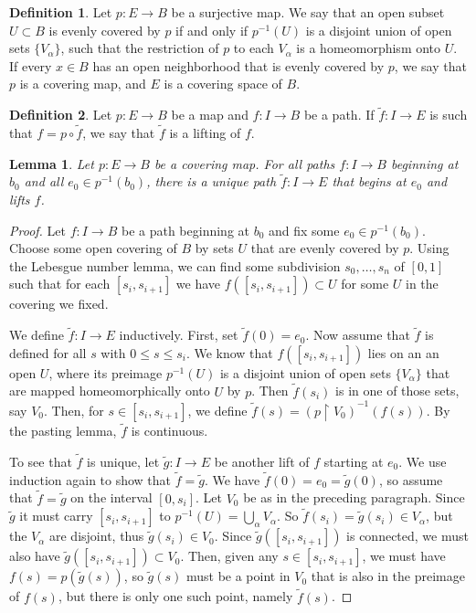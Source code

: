 \documentclass{report}
\newtheorem{lemma}{Lemma}[section]
\theoremstyle{definition}
\newtheorem{definition}{Definition}[section]
\theoremstyle{remark}
\newcommand{\set}[1]{\{#1\}}
\begin{document}
\begin{definition}
    Let $p : E \to B$ be a surjective map. We say that an open subset $U \subset B$ is evenly covered by $p$ if and only if $p^{-1}(U)$ is a disjoint union of open sets $\set{V_\alpha}$, such that the restriction of $p$ to each $V_\alpha$ is a homeomorphism onto $U$. If every $x \in B$ has an open neighborhood that is evenly covered by $p$, we say that $p$ is a covering map, and $E$ is a covering space of $B$.
\end{definition}

\begin{definition}
    Let $p : E \to B$ be a map and $f : I \to B$ be a path. If $\tilde{f} : I \to  E$ is such that $f = p \circ \tilde{f}$, we say that $\tilde{f}$ is a lifting of $f$.
\end{definition}

\begin{lemma} \label{lem_lift_path}
    Let $p : E \to B$ be a covering map. For all paths $f : I \to B$ beginning at $b_0$ and all $e_0 \in p^{-1}(b_0)$, there is a unique path $\tilde{f} : I \to E$ that begins at $e_0$ and lifts $f$.
\end{lemma}

\begin{proof}
    Let $f : I \to B$ be a path beginning at $b_0$ and fix some $e_0 \in p^{-1}(b_0)$. Choose some open covering of $B$ by sets $U$ that are evenly covered by $p$. Using the Lebesgue number lemma, we can find some subdivision $s_0, \dots, s_n$ of $[0, 1]$ such that for each $[s_i, s_{i+1}]$ we have $f([s_i, s_{i+1}]) \subset U$ for some $U$ in the covering we fixed.
    
    We define $\tilde{f} : I \to E$ inductively. First, set $\tilde{f}(0) = e_0$. Now assume that $\tilde{f}$ is defined for all $s$ with $0 \leq s \leq s_i$. We know that $f([s_i, s_{i+1}])$ lies on an an open $U$, where its preimage $p^{-1}(U)$ is a disjoint union of open sets $\set{V_\alpha}$ that are mapped homeomorphically onto $U$ by $p$. Then $\tilde{f}(s_i)$ is in one of those sets, say $V_0$. Then, for $s \in [s_i, s_{i+1}]$, we define $\tilde{f}(s) = (p\restriction{V_0})^{-1}(f(s))$. By the pasting lemma, $\tilde{f}$ is continuous.
    
    To see that $\tilde{f}$ is unique, let $\tilde{g} : I \to E$ be another lift of $f$ starting at $e_0$. We use induction again to show that $\tilde{f} = \tilde{g}$. We have $\tilde{f}(0) = e_0 = \tilde{g}(0)$, so assume that $\tilde{f} = \tilde{g}$ on the interval $[0, s_i]$. Let $V_0$ be as in the preceding paragraph. Since $\tilde{g}$ it must carry $[s_i, s_{i+1}]$ to $p^{-1}(U) = \bigcup_\alpha V_\alpha$. So $\tilde{f}(s_i) = \tilde{g}(s_i) \in V_\alpha$, but the $V_\alpha$ are disjoint, thus $\tilde{g}(s_i) \in V_0$. Since $\tilde{g}([s_i, s_{i+1}])$ is connected, we must also have $\tilde{g}([s_i, s_{i+1}]) \subset V_0$. Then, given any $s \in [s_i, s_{i+1}]$, we must have $f(s) = p(\tilde{g}(s))$, so $\tilde{g}(s)$ must be a point in $V_0$ that is also in the preimage of $f(s)$, but there is only one such point, namely $\tilde{f}(s)$.
\end{proof}
\end{document}

